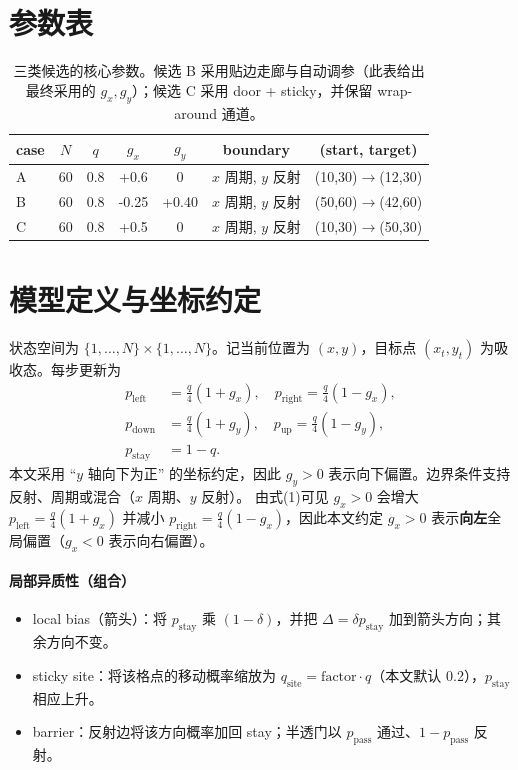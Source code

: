\documentclass[11pt,fontset=fandol]{ctexart}
\begin{document}
\section*{参数表}
\begin{table}[!htbp]
  \centering
  \begin{tabular}{lcccccc}
    \toprule
    case & $N$ & $q$ & $g_x$ & $g_y$ & boundary & (start, target) \\
    \midrule
    A & 60 & 0.8 & +0.6 & 0 & $x$ 周期, $y$ 反射 & (10,30)$\to$(12,30) \\
    B & 60 & 0.8 & -0.25 & +0.40 & $x$ 周期, $y$ 反射 & (50,60)$\to$(42,60) \\
    C & 60 & 0.8 & +0.5 & 0 & $x$ 周期, $y$ 反射 & (10,30)$\to$(50,30) \\
    \bottomrule
  \end{tabular}
  \caption{三类候选的核心参数。候选 B 采用贴边走廊与自动调参（此表给出最终采用的 $g_x,g_y$）；候选 C 采用 door + sticky，并保留 wrap-around 通道。}
  \label{tab:params}
\end{table}

\section{模型定义与坐标约定}
状态空间为 $\{1,\dots,N\}\times\{1,\dots,N\}$。记当前位置为 $(x,y)$，目标点 $(x_t,y_t)$ 为吸收态。每步更新为
\begin{align}
  p_{\text{left}} &= \frac{q}{4}(1+g_x),\quad p_{\text{right}} = \frac{q}{4}(1-g_x),\\
  p_{\text{down}} &= \frac{q}{4}(1+g_y),\quad p_{\text{up}} = \frac{q}{4}(1-g_y),\\
  p_{\text{stay}} &= 1-q.
\end{align}
本文采用 ``$y$ 轴向下为正'' 的坐标约定，因此 $g_y>0$ 表示向下偏置。边界条件支持反射、周期或混合（$x$ 周期、$y$ 反射）。
\noindent 由式(1)可见 \(g_x>0\) 会增大 \(p_{\text{left}}=\frac{q}{4}(1+g_x)\) 并减小 \(p_{\text{right}}=\frac{q}{4}(1-g_x)\)，因此本文约定 \(g_x>0\) 表示\textbf{向左}全局偏置（\(g_x<0\) 表示向右偏置）。

\paragraph{局部异质性（组合）}
\begin{itemize}
  \item local bias（箭头）：将 $p_{\text{stay}}$ 乘 $(1-\delta)$，并把 $\Delta=\delta p_{\text{stay}}$ 加到箭头方向；其余方向不变。
  \item sticky site：将该格点的移动概率缩放为 $q_{\text{site}}=\text{factor}\cdot q$（本文默认 0.2），$p_{\text{stay}}$ 相应上升。
  \item barrier：反射边将该方向概率加回 stay；半透门以 $p_{\text{pass}}$ 通过、$1-p_{\text{pass}}$ 反射。
\end{itemize}
\end{document}
